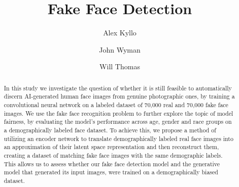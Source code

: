 \documentclass[11pt, letterpaper]{article}
\title{Fake Face Detection}
\author{
  Alex Kyllo
  \and
  John Wyman
  \and
  Will Thomas
}
\begin{document}
\maketitle

\begin{abstract}
  In this study we investigate the question of whether it is still feasible to
  automatically discern AI-generated human face images from genuine photographic
  ones, by training a convolutional neural network on a labeled dataset of
  70,000 real and 70,000 fake face images.
  We use the fake face recognition problem to further explore the topic of
  model fairness, by evaluating the model's performance across age, gender
  and race groups on a demographically labeled face dataset. To achieve this, we
  propose a method of utilizing an encoder network to translate demographically
  labeled real face images into an approximation of their latent space
  representation and then reconstruct them, creating a dataset of matching fake
  face images with the same demographic labels. This allows us to assess whether
  our fake face detection model and the generative model that generated its
  input images, were trained on a demographically biased dataset.
\end{abstract}
\end{document}
